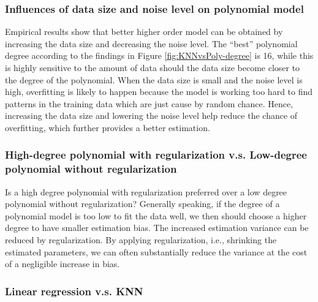 \documentclass[]{article}
\begin{document}
\subsubsection{Influences of data size and noise level on polynomial model}

Empirical results show that better higher order model can be obtained by increasing the data size and decreasing the noise level. 
The ``best'' polynomial degree according to the findings in Figure \ref{fig:KNNvsPoly-degree} is 16, while this is highly sensitive to the amount of data should the data size become closer to the degree of the polynomial. When the data size is small and the noise level is high, overfitting is likely to happen because the model is working too hard to find patterns in the training data which are just cause by random chance. Hence, increasing the data size and lowering the noise level help reduce the chance of overfitting, which further provides a better estimation.

\subsubsection{High-degree polynomial with regularization v.s. Low-degree polynomial without regularization}
Is a high degree polynomial with regularization preferred over a low degree polynomial without regularization? Generally speaking, if the degree of a polynomial model is too low to fit the data well, we then should choose a higher degree to have smaller estimation bias. The increased estimation variance can be reduced by regularization. By applying regularization, i.e., shrinking the estimated parameters, we can often substantially reduce the variance at the cost of a negligible increase in bias.

\subsubsection{Linear regression v.s. KNN}
\end{document}
